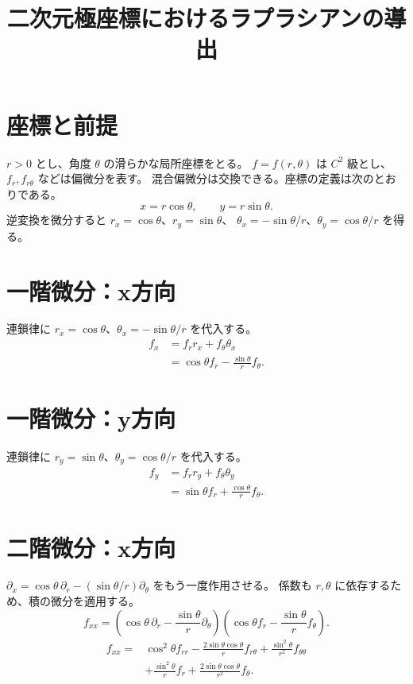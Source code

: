 \documentclass[a4paper,10pt]{ltjsarticle}
\title{二次元極座標におけるラプラシアンの導出}
\author{}
\date{}
\begin{document}
\maketitle
\section*{座標と前提}
$r>0$ とし、角度 $\theta$ の滑らかな局所座標をとる。
$f=f(r,\theta)$ は $C^2$ 級とし、$f_r,f_{r\theta}$ などは偏微分を表す。
混合偏微分は交換できる。座標の定義は次のとおりである。
\begin{equation}
 x=r\cos\theta,\qquad y=r\sin\theta. \label{coordinates}
\end{equation}
逆変換を微分すると $r_x=\cos\theta$、$r_y=\sin\theta$、
$\theta_x=-\sin\theta/r$、$\theta_y=\cos\theta/r$ を得る。
\section*{一階微分：x方向}
連鎖律に $r_x=\cos\theta$、$\theta_x=-\sin\theta/r$ を代入する。
\begin{align}
 f_x &= f_r r_x+f_\theta\theta_x \label{dx-chain}\\
     &= \cos\theta f_r-\frac{\sin\theta}{r}f_\theta. \label{dx-result}
\end{align}
\section*{一階微分：y方向}
連鎖律に $r_y=\sin\theta$、$\theta_y=\cos\theta/r$ を代入する。
\begin{align}
 f_y &= f_r r_y+f_\theta\theta_y \label{dy-chain}\\
     &= \sin\theta f_r+\frac{\cos\theta}{r}f_\theta. \label{dy-result}
\end{align}
\section*{二階微分：x方向}
$\partial_x=\cos\theta\,\partial_r-(\sin\theta/r)\partial_\theta$ をもう一度作用させる。
係数も $r,\theta$ に依存するため、積の微分を適用する。
\begin{equation}
 f_{xx}=\left(\cos\theta\,\partial_r-\frac{\sin\theta}{r}\partial_\theta\right)
 \left(\cos\theta f_r-\frac{\sin\theta}{r}f_\theta\right). \label{dxx-operator}
\end{equation}
\begin{equation}
 \begin{aligned}
 f_{xx}={}&\cos^2\theta f_{rr}-\frac{2\sin\theta\cos\theta}{r}f_{r\theta}
              +\frac{\sin^2\theta}{r^2}f_{\theta\theta}\\
          &+\frac{\sin^2\theta}{r}f_r+\frac{2\sin\theta\cos\theta}{r^2}f_\theta.
 \end{aligned}\label{dxx-expanded}
\end{equation}
\newpage
\end{document}
